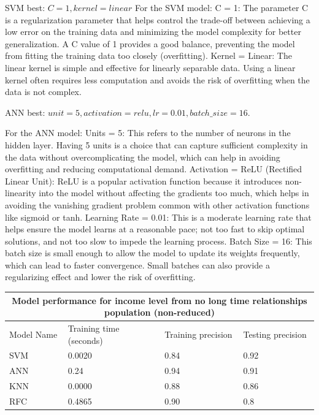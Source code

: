 SVM best: $C =1, kernel = linear$
For the SVM model:
C = 1: The parameter C is a regularization parameter that helps control the trade-off between achieving a low error on the training data and minimizing the model complexity for better generalization. A C value of 1 provides a good balance, preventing the model from fitting the training data too closely (overfitting).
Kernel = Linear: The linear kernel is simple and effective for linearly separable data. Using a linear kernel often requires less computation and avoids the risk of overfitting when the data is not complex.

ANN best: $unit = 5, activation = relu, lr = 0.01, batch\_size = 16$.

For the ANN model:
Units = 5: This refers to the number of neurons in the hidden layer. Having 5 units is a choice that can capture sufficient complexity in the data without overcomplicating the model, which can help in avoiding overfitting and reducing computational demand.
Activation = ReLU (Rectified Linear Unit): ReLU is a popular activation function because it introduces non-linearity into the model without affecting the gradients too much, which helps in avoiding the vanishing gradient problem common with other activation functions like sigmoid or tanh.
Learning Rate = 0.01: This is a moderate learning rate that helps ensure the model learns at a reasonable pace; not too fast to skip optimal solutions, and not too slow to impede the learning process.
Batch Size = 16: This batch size is small enough to allow the model to update its weights frequently, which can lead to faster convergence. Small batches can also provide a regularizing effect and lower the risk of overfitting.

\begin{table}[h!]
    \centering
    \begin{tabular}{ |p{3cm}||p{5cm}|p{4cm}|p{4cm}|}
    \hline
    \multicolumn{4}{|c|}{Model performance for income level from no long time relationships population (non-reduced)}\\
    \hline
    Model Name& Training time (seconds)& Training precision & Testing precision \\
    \hline
    SVM &0.0020   &0.84&0.92\\
    ANN &0.24  & 0.94 & 0.91\\
    KNN &0.0000 & 0.88&0.86\\
    RFC & 0.4865 & 0.90&0.8\\
    \hline
   \end{tabular}
\end{table}

